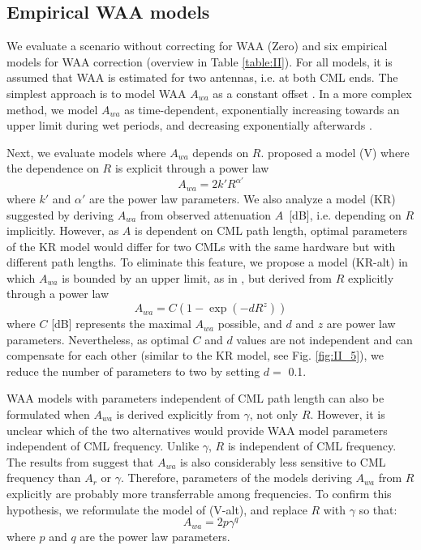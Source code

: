 \documentclass{ctuthesis}\usepackage[]{graphicx}\usepackage[]{color}
\begin{document}
\subsection{Empirical WAA models} \label{paperIIMethB}

We evaluate a scenario without correcting for WAA (Zero) and six empirical models for WAA correction (overview in Table \ref{table:II}). For all models, it is assumed that WAA is estimated for two antennas, i.e. at both CML ends. The simplest approach is to model WAA $A_{wa}$ as a constant offset \citep[O; ][]{overeemMeasuringUrbanRainfall2011}. In a more complex method, we model $A_{wa}$ as time-dependent, exponentially increasing towards an upper limit during wet periods, and decreasing exponentially afterwards \citep[S; ][]{schleissQuantificationModelingWetAntenna2013}. 

Next, we evaluate models where $A_{wa}$ depends on $R$.  \cite{valtrExcessAttenuationCaused2019} proposed a model (V) where the dependence on $R$ is explicit through a power law
        \begin{equation} \label{eq:II_1}
        A_{wa} = 2 k' R^{\alpha'}
        \end{equation}
where $k'$ and $\alpha'$ are the power law parameters. We also analyze a model (KR) suggested by \cite{kharadlyEffectWetAntenna2001} deriving $A_{wa}$ from observed attenuation $A$~[dB], i.e. depending on $R$ implicitly. However, as $A$ is dependent on CML path length, optimal parameters of the KR model would differ for two CMLs with the same hardware but with different path lengths. To eliminate this feature, we propose a model (KR-alt) in which $A_{wa}$ is bounded by an upper limit, as in \cite{kharadlyEffectWetAntenna2001}, but derived from $R$ explicitly through a power law
        \begin{equation} \label{eq:II_2}
        A_{wa} = C ( 1 - \exp(-d R^z)  )
        \end{equation}
where $C$ [dB] represents the maximal $A_{wa}$ possible, and $d$ and $z$ are power law parameters. Nevertheless, as optimal $C$ and $d$ values are not independent and can compensate for each other (similar to the KR model, see Fig. \ref{fig:II_5}), we reduce the number of parameters to two by setting $d =$ 0.1.

WAA models with parameters independent of CML path length can also be formulated when $A_{wa}$ is derived explicitly from $\gamma$, not only $R$. However, it is unclear which of the two alternatives would provide WAA model parameters independent of CML frequency. Unlike $\gamma$, $R$ is independent of CML frequency. The results from \cite{leijnseMicrowaveLinkRainfall2008} suggest that $A_{wa}$ is also considerably less sensitive to CML frequency than $A_r$ or $\gamma$. Therefore, parameters of the models deriving $A_{wa}$ from $R$ explicitly are probably more transferrable among frequencies. To confirm this hypothesis, we reformulate the model of \cite{valtrExcessAttenuationCaused2019} (V-alt), and replace $R$ with $\gamma$ so that: 
        \begin{equation} \label{eq:II_3}
        A_{wa} = 2 p \gamma^q
        \end{equation}
where $p$ and $q$ are the power law parameters. 
\end{document}
